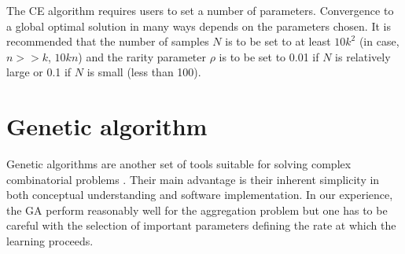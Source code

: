 \documentclass[11pt]{article}
\begin{document}
        The CE algorithm requires users to set a number of
        parameters. Convergence to a global optimal solution
        in many ways depends on the parameters chosen. It is recommended
        that the number of samples $N$ is to be set to at least
        $10k^2$ (in case, $n>>k$, $10kn$) and the rarity parameter $\rho$ is to be set to 0.01
        if $N$ is relatively large or 0.1 if $N$ is small (less
        than 100). 

\section{Genetic algorithm}
    Genetic algorithms are another set of tools suitable for solving
    complex combinatorial problems \cite{Gol89}. Their main advantage is their
    inherent simplicity in both conceptual understanding and software implementation.
    In our experience, the GA perform reasonably well for the aggregation problem but one 
    has to be careful with the selection of important parameters defining the rate at which
    the learning proceeds.
    
\end{document}
